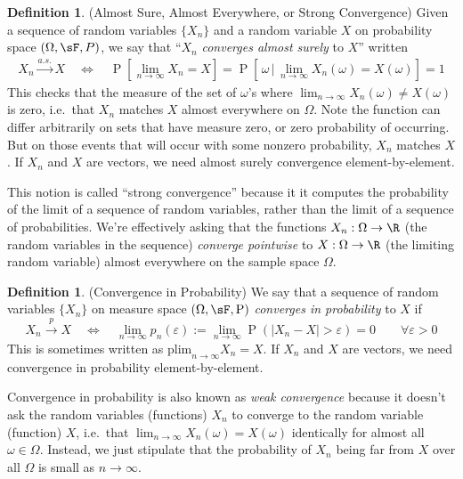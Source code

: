 \documentclass[12pt]{article}
\theoremstyle{plain}
\theoremstyle{definition}
\newtheorem{defn}[thm]{Definition}
\theoremstyle{remark}
\newcommand{\ra}{\rightarrow}
\newcommand{\Prb}{\operatorname{P}}
\newcommand{\asto}{\xrightarrow{a.s.}}
\newcommand{\pto}{\xrightarrow{p}}
\newcommand{\plim}{\text{plim}_{n\rightarrow\infty}}
\newcommand{\limn}{\lim_{n\rightarrow\infty}}
\begin{document}
\begin{defn}{(Almost Sure, Almost Everywhere, or Strong Convergence)}
Given a sequence of random variables $\{X_n\}$ and a random variable
$X$ on probability space $(\Omega,\sF,P)$, we say that ``$X_n$
\emph{converges almost surely} to $X$'' written
\begin{align*}
  X_n\asto X
  \quad \iff \quad
  \Prb\left[\limn X_n = X\right]
  = \Prb\left[\,\omega \,\big|\,\limn X_n(\omega) = X(\omega)\right]
  = 1
\end{align*}
This checks that the measure of the set of $\omega$'s where
$\limn X_n(\omega)\neq X(\omega)$ is zero, i.e.\ that $X_n$ matches $X$
almost everywhere on $\Omega$.
Note the function can differ arbitrarily on sets that have measure zero,
or zero probability of occurring. But on those events that will occur
with some nonzero probability, $X_n$ matches $X$.  If $X_n$ and $X$ are
vectors, we need almost surely convergence element-by-element.

This notion is called ``strong convergence'' because it it computes the
probability of the limit of a sequence of random variables, rather than
the limit of a sequence of probabilities. We're effectively asking that
the functions $X_n:\Omega\ra\R$ (the random variables in the sequence)
\emph{converge pointwise} to $X:\Omega\ra\R$ (the limiting random
variable) almost everywhere on the sample space $\Omega$.
\end{defn}


\begin{defn}{(Convergence in Probability)}
We say that a sequence of random variables $\{ X_n \}$ on measure space
$(\Omega,\sF,\Prb)$ \emph{converges in probability} to $X$ if
\begin{equation}
  \label{plim}
  X_n\pto X
  \quad\iff\quad
  \limn p_n(\varepsilon) :=
  \limn
  \Prb(\left\lvert X_n - X \right\rvert > \varepsilon) = 0
  \qquad \forall  \varepsilon> 0
\end{equation}
This is sometimes written as $\plim X_n = X$.
If $X_n$ and $X$ are vectors, we need convergence in probability
element-by-element.

Convergence in probability is also known as \emph{weak convergence}
because it doesn't ask the random variables (functions) $X_n$ to
converge to the random variable (function) $X$, i.e.\ that
$\limn X_n(\omega)=X(\omega)$ identically for almost all
$\omega\in\Omega$.
Instead, we just stipulate that the probability of $X_n$ being far from
$X$ over all $\Omega$ is small as $n\rightarrow\infty$.
\end{defn}
\end{document}
